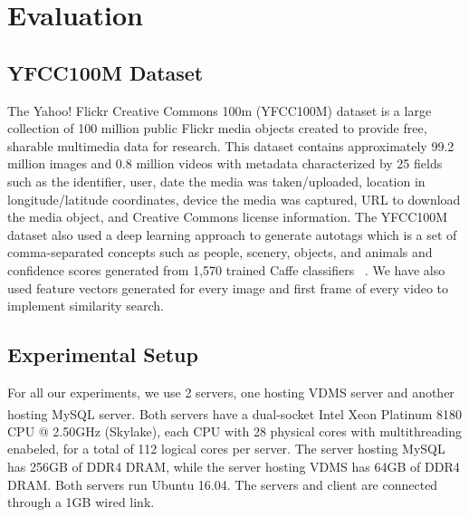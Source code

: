 \section{Evaluation}
\label{eval}

\subsection{YFCC100M Dataset}
\label{dataset}

The Yahoo! Flickr Creative Commons 100m (YFCC100M) dataset is a large collection of 100 million public Flickr media objects created to provide free, sharable multimedia data for research. This dataset contains approximately 99.2 million images and 0.8 million videos with metadata characterized by 25 fields such as the identifier, user, date the media was taken/uploaded, location in longitude/latitude coordinates, device the media was captured, URL to download the media object, and Creative Commons license information.  The YFCC100M dataset also used a deep learning approach to generate autotags which is a set of comma-separated concepts such as people, scenery, objects, and animals and confidence scores generated from 1,570 trained Caffe classifiers ~\cite{Thomee_2016}.
We have also used feature vectors generated for every image and first frame
of every video \cite{features} to implement similarity search.

\subsection{Experimental Setup}

For all our experiments, we use 2 servers, one hosting VDMS server and
another hosting MySQL server. Both servers have a dual-socket
Intel\textsuperscript{\textregistered}
Xeon\textsuperscript{\textregistered} Platinum 8180 CPU @ 2.50GHz (Skylake),
each CPU with 28 physical cores with multithreading enabeled,
for a total of 112 logical cores per server.
The server hosting MySQL has 256GB of DDR4 DRAM, while the server hosting VDMS
has 64GB of DDR4 DRAM. Both servers run Ubuntu 16.04.
The servers and client are connected through a 1GB wired link.

